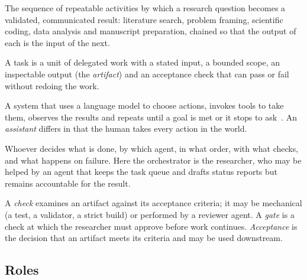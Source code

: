 \begin{description}[leftmargin=1.2em,style=nextline]
  \item[Research workflow] The sequence of repeatable activities by which a research
    question becomes a validated, communicated result: literature search, problem
    framing, scientific coding, data analysis and manuscript preparation, chained so that
    the output of each is the input of the next.
  \item[Task and artifact] A task is a unit of delegated work with a stated input, a
    bounded scope, an inspectable output (the \textit{artifact}) and an acceptance check
    that can pass or fail without redoing the work.
  \item[Agent] A system that uses a language model to choose actions, invokes tools to
    take them, observes the results and repeats until a goal is met or it stops to
    ask~\cite{yao2023react}. An \textit{assistant} differs in that the human takes every
    action in the world.
  \item[Orchestrator] Whoever decides what is done, by which agent, in what order, with
    what checks, and what happens on failure. Here the orchestrator is the researcher,
    who may be helped by an agent that keeps the task queue and drafts status reports but
    remains accountable for the result.
  \item[Check, gate and acceptance] A \textit{check} examines an artifact against its
    acceptance criteria; it may be mechanical (a test, a validator, a strict build) or
    performed by a reviewer agent. A \textit{gate} is a check at which the researcher
    must approve before work continues. \textit{Acceptance} is the decision that an
    artifact meets its criteria and may be used downstream.
\end{description}

\subsection{Roles}
\label{sec:roles}

